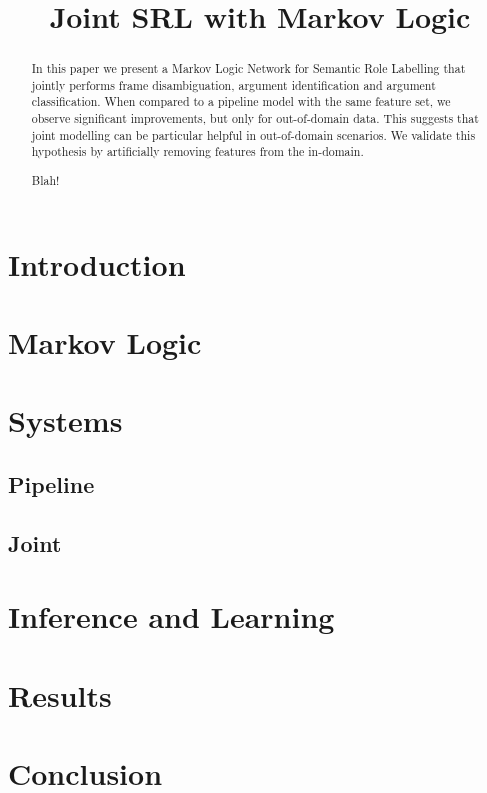 \documentclass[11pt]{article}
\title{Joint SRL with Markov Logic}
\author{}
\date{}
\begin{document}



\maketitle
\begin{abstract}
In this paper we present a Markov Logic Network for Semantic Role
Labelling that jointly performs frame disambiguation, argument
identification and argument classification. When compared to a
pipeline model with the same feature set, we observe significant
improvements, but only for out-of-domain data. This suggests that
joint modelling can be particular helpful in out-of-domain
scenarios. We validate this hypothesis by artificially removing
features from the in-domain.  

Blah!
\end{abstract}

\section{Introduction}



\section{Markov Logic} \label{sec:markovlogic}



\section{Systems} \label{sec:systems} 
%

\subsection{Pipeline}\label{sec:pipeline} 
 
%

\subsection{Joint}\label{sec:joint} 

%

\section{Inference and Learning}\label{sec:inference}

%

\section{Results}\label{sec:results}

%

\section{Conclusion} \label{sec:conclusion}

%



\end{document}
